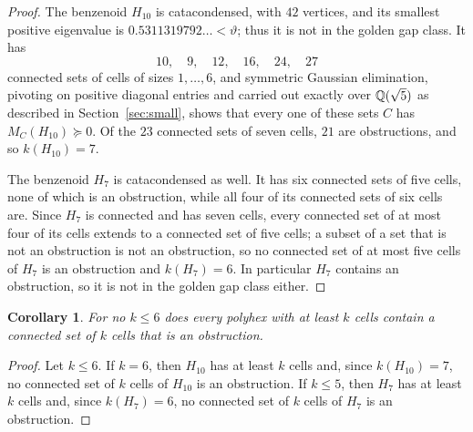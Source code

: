 \documentclass[11pt]{article}
\newcommand\thetaG{\vartheta}
\newtheorem{corollary}[theorem]{Corollary}
\theoremstyle{definition}
\begin{document}
\begin{proof}
The benzenoid $H_{10}$ is catacondensed, with $42$ vertices, and its
smallest positive eigenvalue is $0.5311319792\ldots<\thetaG$; thus it is not
in the golden gap class.  It has
\[
 10,\quad 9,\quad 12,\quad 16,\quad 24,\quad 27
\]
connected sets of cells of sizes $1,\ldots,6$, and symmetric Gaussian
elimination, pivoting on positive diagonal entries and carried out exactly
over ${\mathbb Q}(\sqrt5)$ as described in Section~\ref{sec:small}, shows that
every one of these sets $C$ has $M_C(H_{10})\succeq0$.  Of the $23$ connected
sets of seven cells, $21$ are obstructions, and so $k(H_{10})=7$.

The benzenoid $H_{7}$ is catacondensed as well.  It has six connected sets of
five cells, none of which is an obstruction, while all four of its connected
sets of six cells are.  Since $H_{7}$ is connected and has seven cells, every
connected set of at most four of its cells extends to a connected set of five
cells; a subset of a set that is not an obstruction is not an obstruction, so
no connected set of at most five cells of $H_{7}$ is an obstruction and
$k(H_{7})=6$.  In particular $H_{7}$ contains an obstruction, so it is not in
the golden gap class either.
\end{proof}

\begin{corollary}\label{cor:nosix}
For no $k\le6$ does every polyhex with at least $k$ cells contain a connected
set of $k$ cells that is an obstruction.
\end{corollary}

\begin{proof}
Let $k\le6$.  If $k=6$, then $H_{10}$ has at least $k$ cells and, since
$k(H_{10})=7$, no connected set of $k$ cells of $H_{10}$ is an obstruction.
If $k\le5$, then $H_{7}$ has at least $k$ cells and, since $k(H_{7})=6$, no
connected set of $k$ cells of $H_{7}$ is an obstruction.
\end{proof}
\end{document}
